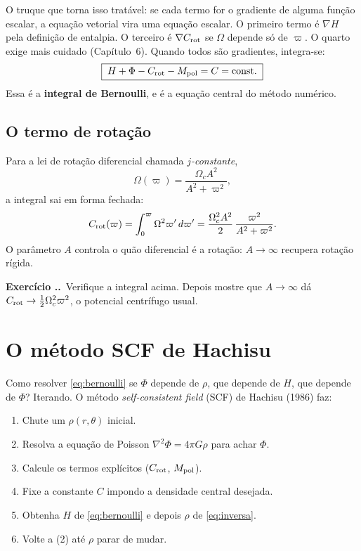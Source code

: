 \documentclass[11pt,a4paper]{article}
\newcounter{exerc}[section]
\newcommand{\ex}[1]{\refstepcounter{exerc}%
  \medskip\noindent\textbf{Exercício \thesection.\theexerc.}\ #1\medskip}
\begin{document}
O truque que torna isso tratável: se cada termo for o gradiente de alguma
função escalar, a equação vetorial vira uma equação escalar. O primeiro termo é
$\nabla H$ pela definição de entalpia. O terceiro é $\nabla C_{\rm rot}$ se
$\Omega$ depende só de $\varpi$. O quarto exige mais cuidado (Capítulo~6).
Quando todos são gradientes, integra-se:
\begin{equation}
\boxed{\;H + \Phi - C_{\rm rot} - M_{\rm pol} = C = \text{const.}\;}
\label{eq:bernoulli}
\end{equation}
Essa é a \textbf{integral de Bernoulli}, e é a equação central do método
numérico.

\subsection{O termo de rotação}

Para a lei de rotação diferencial chamada \emph{$j$-constante},
\begin{equation}
\Omega(\varpi) = \frac{\Omega_c A^2}{A^2 + \varpi^2},
\end{equation}
a integral sai em forma fechada:
\begin{equation}
C_{\rm rot}(\varpi) = \int_0^\varpi \Omega^2 \varpi'\,d\varpi'
= \frac{\Omega_c^2 A^2}{2}\,\frac{\varpi^2}{A^2+\varpi^2}.
\end{equation}
O parâmetro $A$ controla o quão diferencial é a rotação: $A \to \infty$
recupera rotação rígida.

\ex{Verifique a integral acima. Depois mostre que $A\to\infty$ dá
$C_{\rm rot}\to \frac{1}{2}\Omega_c^2\varpi^2$, o potencial centrífugo usual.}

\section{O método SCF de Hachisu}

Como resolver \eqref{eq:bernoulli} se $\Phi$ depende de $\rho$, que depende de
$H$, que depende de $\Phi$? Iterando. O método \emph{self-consistent field}
(SCF) de Hachisu (1986) faz:

\begin{enumerate}
\item Chute um $\rho(r,\theta)$ inicial.
\item Resolva a equação de Poisson $\nabla^2\Phi = 4\pi G\rho$ para achar
      $\Phi$.
\item Calcule os termos explícitos ($C_{\rm rot}$, $M_{\rm pol}$).
\item Fixe a constante $C$ impondo a densidade central desejada.
\item Obtenha $H$ de \eqref{eq:bernoulli} e depois $\rho$ de
      \eqref{eq:inversa}.
\item Volte a (2) até $\rho$ parar de mudar.
\end{enumerate}
\end{document}
